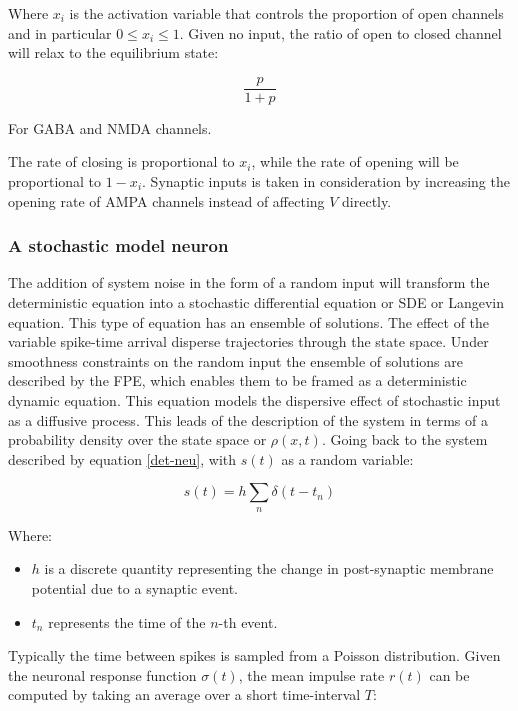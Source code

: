 		Where $x_i$ is the activation variable that controls the proportion of open channels and in particular $0\le x_i\le 1$.
		Given no input, the ratio of open to closed channel will relax to the equilibrium state:

		$$\frac{p}{1+p}$$

		For GABA and NMDA channels.

		The rate of closing is proportional to $x_i$, while the rate of opening will be proportional to $1-x_i$.
		Synaptic inputs is taken in consideration by increasing the opening rate of AMPA channels instead of affecting $V$ directly.

		\subsubsection{A stochastic model neuron}
		The addition of system noise in the form of a random input will transform the deterministic equation into a stochastic differential equation or SDE or Langevin equation.
		This type of equation has an ensemble of solutions.
		The effect of the variable spike-time arrival disperse trajectories through the state space.
		Under smoothness constraints on the random input the ensemble of solutions are described by the FPE, which enables them to be framed as a deterministic dynamic equation.
		This equation models the dispersive effect of stochastic input as a diffusive process.
		This leads of the description of the system in terms of a probability density over the state space or $\rho(x,t)$.
		Going back to the system described by equation \ref{det-neu}, with $s(t)$ as a random variable:

		\begin{equation}
			s(t) = h\sum\limits_n\delta(t-t_n)
		\end{equation}

		Where:

		\begin{itemize}
			\item $h$ is a discrete quantity representing the change in post-synaptic membrane potential due to a synaptic event.
			\item $t_n$ represents the time of the $n$-th event.
		\end{itemize}

		Typically the time between spikes is sampled from a Poisson distribution.
		Given the neuronal response function $\sigma(t)$, the mean impulse rate $r(t)$ can be computed by taking an average over a short time-interval $T$:


